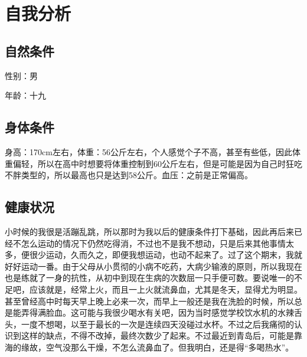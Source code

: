 \documentclass{article}
\begin{document}
\thispagestyle{empty}
\newpage
\setcounter{page}{1}
\section{自我分析}
\subsection{自然条件}
性别：男\par
年龄：十九\par
\subsection{身体条件}
身高：170cm左右，体重：56公斤左右，个人感觉个子不高，甚至有些低，因此体重偏轻，所以在高中时想要将体重控制到60公斤左右，但是可能是因为自己时狂吃不胖类型的，所以最高也只是达到58公斤。血压：之前是正常偏高。\par
\subsection{健康状况}
小时候的我很是活蹦乱跳，所以那时为我以后的健康条件打下基础，因此再后来已经不怎么运动的情况下仍然吃得消，不过也不是我不想动，只是后来其他事情太多，便很少运动，久而久之，即便我想运动，也动不起来了。过了这个期末，我就好好运动一番。由于父母从小贯彻的小病不吃药，大病少输液的原则，所以我现在也是练就了一身的抗性，从初中到现在生病的次数屈一只手便可数。要说唯一的不足吧，应该就是，经常上火，而且一上火就流鼻血，尤其是冬天，显得尤为明显。甚至曾经高中时每天早上晚上必来一次，而早上一般还是我在洗脸的时候，所以总是能弄得满脸血。这可能与我很少喝水有关吧，因为当时感觉学校饮水机的水辣舌头，一度不想喝，以至于最长的一次是连续四天没碰过水杯。不过之后我痛彻的认识到这样的缺点，不得不改掉，最终次数少了起来。不过最近到青岛后，可能是靠海的缘故，空气没那么干燥，不怎么流鼻血了。但我明白，还是得“多喝热水”。\par
\end{document}
